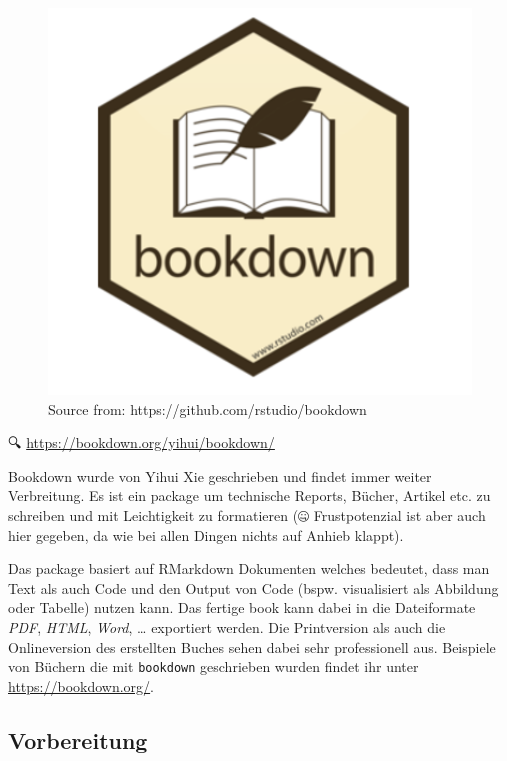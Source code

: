 \documentclass[
]{article}
\begin{document}
\begin{figure}

{\centering \includegraphics[width=1\linewidth]{images/065} 

}

\caption{Source from: https://github.com/rstudio/bookdown}\label{fig:unnamed-chunk-306}
\end{figure}

🔍 \url{https://bookdown.org/yihui/bookdown/}

Bookdown wurde von Yihui Xie geschrieben und findet immer weiter Verbreitung. Es ist ein package um technische Reports, Bücher, Artikel etc. zu schreiben und mit Leichtigkeit zu formatieren (🤐 Frustpotenzial ist aber auch hier gegeben, da wie bei allen Dingen nichts auf Anhieb klappt).

Das package basiert auf RMarkdown Dokumenten welches bedeutet, dass man Text als auch Code und den Output von Code (bspw. visualisiert als Abbildung oder Tabelle) nutzen kann. Das fertige book kann dabei in die Dateiformate \emph{PDF}, \emph{HTML}, \emph{Word}, \ldots{} exportiert werden. Die Printversion als auch die Onlineversion des erstellten Buches sehen dabei sehr professionell aus. Beispiele von Büchern die mit \texttt{bookdown} geschrieben wurden findet ihr unter \url{https://bookdown.org/}.

\hypertarget{vorbereitung}{%
\subsection{Vorbereitung}\label{vorbereitung}}
\end{document}
